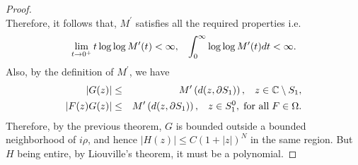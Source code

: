 \documentclass[11pt,reqno]{amsart}
\theoremstyle{definition}
\theoremstyle{definition}
\numberwithin{equation}{section}
\begin{document}
\begin{proof}
$$$$
Therefore, it follows that, $M^\prime$ satisfies all the  required properties i.e.
$$
\lim_{t\rightarrow 0^+}t\log\log M^\prime(t)<\infty,\hspace{3mm}\int_0^\infty\log\log M^\prime(t)dt<\infty.
$$ 
Also, by the definition of $M^\prime$, we have 
\begin{eqnarray*}
|G(z)|&\leq &M^\prime\left(d(z,\partial S_1)\right),
\hspace{3mm}z\in\mathbb{C}\setminus S_1,\\
|F(z)G(z)|&\leq & M^\prime\left(d(z,\partial S_1)\right),
\hspace{3mm}z\in S_1^0,
\hspace{1mm}\textup{for all}\hspace{1mm}F\in \Omega.
\end{eqnarray*}
Therefore, by the previous theorem,
$G$ is bounded outside a bounded neighborhood of $i\rho$, and hence $|H(z)|\leq C(1+|z|)^N$ in the same region. But $H$ being entire, by Liouville's theorem, it must be a polynomial.
\end{proof}
\end{document}
